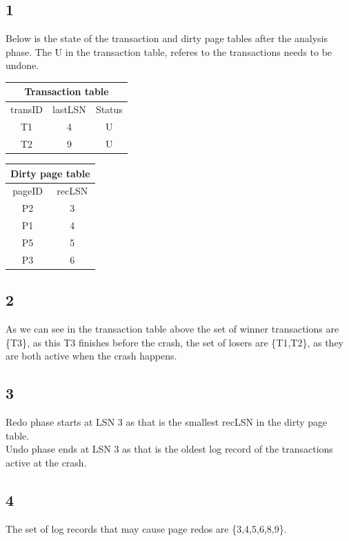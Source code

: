 \documentclass{article}
\theoremstyle{plain}
\theoremstyle{nonumberplain}
\begin{document}
\subsection*{1}

Below is the state of the transaction and dirty page tables after the analysis phase.
The U in the transaction table, referes to the transactions needs to be undone.\\
\begin{tabular}{| c | c | c |}
	\hline
	\multicolumn{3}{|c|}{Transaction table} \\
	\hline
	transID & lastLSN & Status\\
	\hline
	T1 & 4 & U\\
	\hline
	T2 & 9 & U\\
	\hline
\end{tabular}
\begin{tabular}{| c | c |}
	\hline
	\multicolumn{2}{|c|}{Dirty page table} \\
	\hline
	pageID & recLSN \\
	\hline
	P2 & 3 \\
	\hline
	P1 & 4 \\
	\hline
	P5 & 5 \\
	\hline
	P3 & 6 \\
	\hline
\end{tabular}

\subsection*{2}

As we can see in the transaction table above the set of winner transactions are \{T3\}, as this T3 finishes before the crash, the set of losers are \{T1,T2\}, as they are both active when the crash happens.


\subsection*{3}
Redo phase starts at LSN 3 as that is the smallest recLSN in the dirty page table.\\
Undo phase ends at LSN 3 as that is the oldest log record of the transactions active at the crash.

\subsection*{4}
The set of log records that may cause page redos are \{3,4,5,6,8,9\}.
\end{document}
